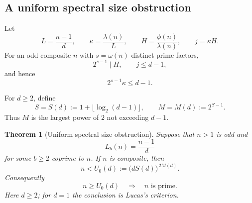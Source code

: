 \documentclass[11pt]{article}
\newtheorem{theorem}{Theorem}[section]
\begin{document}
\subsection{A uniform spectral size obstruction}
\label{sec:uniform-size}

Let
\[
L=\frac{n-1}{d},\qquad
\kappa=\frac{\lambda(n)}{L},\qquad
H=\frac{\phi(n)}{\lambda(n)},\qquad
j=\kappa H.
\]
For an odd composite $n$ with $s=\omega(n)$ distinct prime factors,
\[
2^{s-1}\mid H,\qquad j\le d-1,
\]
and hence
\[
2^{s-1}\kappa\le d-1.
\tag{U1}\label{eq:u1}
\]

For $d\ge2$, define
\[
S=S(d):=1+\lfloor\log_2(d-1)\rfloor,
\qquad
M=M(d):=2^{S-1}.
\]
Thus $M$ is the largest power of $2$ not exceeding $d-1$.

\begin{theorem}[Uniform spectral size obstruction]
\label{thm:uniform-U}
Suppose that $n>1$ is odd and
\[
L_b(n)=\frac{n-1}{d}
\]
for some $b\ge2$ coprime to $n$.  If $n$ is composite, then
\[
\boxed{
 n< U_0(d):=\bigl(dS(d)\bigr)^{\,2M(d)} .
}
\tag{U2}\label{eq:U0}
\]
Consequently
\[
n\ge U_0(d)\quad\Longrightarrow\quad n\text{ is prime}.
\]
Here $d\ge2$; for $d=1$ the conclusion is Lucas's criterion.
\end{theorem}
\end{document}
